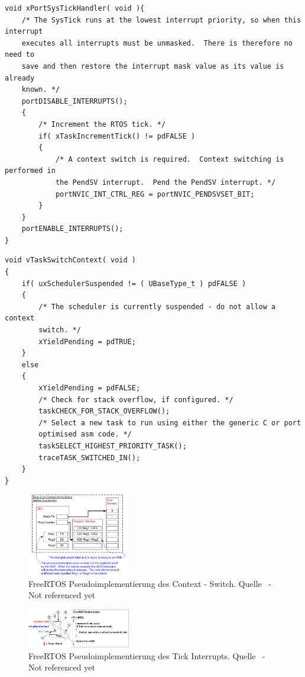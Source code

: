 \begin{lstlisting}[caption={Implementierung von SysTick aus Task.c}, linewidth=8cm,captionpos=b, label=lst:SysTickS, float=hbt]
void xPortSysTickHandler( void ){
	/* The SysTick runs at the lowest interrupt priority, so when this interrupt
	executes all interrupts must be unmasked.  There is therefore no need to
	save and then restore the interrupt mask value as its value is already
	known. */
	portDISABLE_INTERRUPTS();
	{
		/* Increment the RTOS tick. */
		if( xTaskIncrementTick() != pdFALSE )
		{
			/* A context switch is required.  Context switching is performed in
			the PendSV interrupt.  Pend the PendSV interrupt. */
			portNVIC_INT_CTRL_REG = portNVIC_PENDSVSET_BIT;
		}
	}
	portENABLE_INTERRUPTS();
}
\end{lstlisting}


\begin{lstlisting}[caption={Implementierung von Kontextwechsel aus Task.c}, linewidth=8cm,captionpos=b, label=lst:taskSwitch, float=hbt]
void vTaskSwitchContext( void )
{
	if( uxSchedulerSuspended != ( UBaseType_t ) pdFALSE )
	{
		/* The scheduler is currently suspended - do not allow a context
		switch. */
		xYieldPending = pdTRUE;
	}
	else
	{
		xYieldPending = pdFALSE;
		/* Check for stack overflow, if configured. */
		taskCHECK_FOR_STACK_OVERFLOW();
		/* Select a new task to run using either the generic C or port
		optimised asm code. */
		taskSELECT_HIGHEST_PRIORITY_TASK();
		traceTASK_SWITCHED_IN();
	}
}
\end{lstlisting}



\begin{figure}[ht!]
	\centering
		\includegraphics[width=0.4\textwidth]{Pictures/FreeRTOSOrg/ExeContext.png}
	\caption{FreeRTOS Pseudoimplementierung des Context - Switch. Quelle~\protect{} - Not referenced yet}
	\label{fig:FreeRTOSFsm}
	
\end{figure}

\begin{figure}[ht!]
	\centering
		\includegraphics[width=0.4\textwidth]{Pictures/FreeRTOSOrg/TickISR.png}
	\caption{FreeRTOS Pseudoimplementierung des Tick Interrupts. Quelle~\protect{} - Not referenced yet}
	\label{fig:FreeRTOSFsm}
\end{figure}